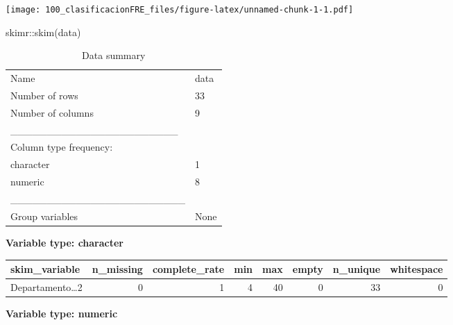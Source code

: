 \documentclass[
]{article}
\newenvironment{Shaded}{\begin{snugshade}}{\end{snugshade}}
\newcommand{\FunctionTok}[1]{\textcolor[rgb]{0.00,0.00,0.00}{#1}}
\newcommand{\NormalTok}[1]{#1}
\newcommand{\SpecialCharTok}[1]{\textcolor[rgb]{0.00,0.00,0.00}{#1}}
\begin{document}
\texttt{[image: 100\_clasificacionFRE\_files/figure-latex/unnamed-chunk-1-1.pdf]}

\begin{Shaded}
\begin{Highlighting}[]
\NormalTok{skimr}\SpecialCharTok{::}\FunctionTok{skim}\NormalTok{(data)}
\end{Highlighting}
\end{Shaded}

\begin{longtable}[]{@{}ll@{}}
\caption{Data summary}\tabularnewline
\toprule
\endhead
Name & data \\
Number of rows & 33 \\
Number of columns & 9 \\
\_\_\_\_\_\_\_\_\_\_\_\_\_\_\_\_\_\_\_\_\_\_\_ & \\
Column type frequency: & \\
character & 1 \\
numeric & 8 \\
\_\_\_\_\_\_\_\_\_\_\_\_\_\_\_\_\_\_\_\_\_\_\_\_ & \\
Group variables & None \\
\bottomrule
\end{longtable}

\textbf{Variable type: character}

\begin{longtable}[]{@{}lrrrrrrr@{}}
\toprule
skim\_variable & n\_missing & complete\_rate & min & max & empty &
n\_unique & whitespace \\
\midrule
\endhead
Departamento\ldots2 & 0 & 1 & 4 & 40 & 0 & 33 & 0 \\
\bottomrule
\end{longtable}

\textbf{Variable type: numeric}
\end{document}
